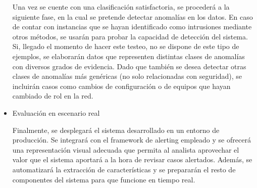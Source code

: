 \begin{itemize}
Una vez se cuente con una clasificación satisfactoria, se procederá a la siguiente fase, en la cual se pretende detectar anomalías en los datos.
En caso de contar con instancias que se hayan identificado como intrusiones mediante otros métodos, se usarán para probar la capacidad de detección del sistema.
Si, llegado el momento de hacer este testeo, no se dispone de este tipo de ejemplos, se elaborarán datos que representen distintas clases de anomalías con diversos grados de evidencia.
Dado que también se desea detectar otras clases de anomalías más genéricas (no solo relacionadas con seguridad), se incluirán casos como cambios de configuración o de equipos que hayan cambiado de rol en la red.

    \item Evaluación en escenario real

Finalmente, se desplegará el sistema desarrollado en un entorno de producción.
Se integrará con el framework de alerting empleado y se ofrecerá una representación visual adecuada que permita al analista aprovechar el valor que el sistema aportará a la hora de revisar casos alertados.
Además, se automatizará la extracción de características y se prepararán el resto de componentes del sistema para que funcione en tiempo real.

\end{itemize}
